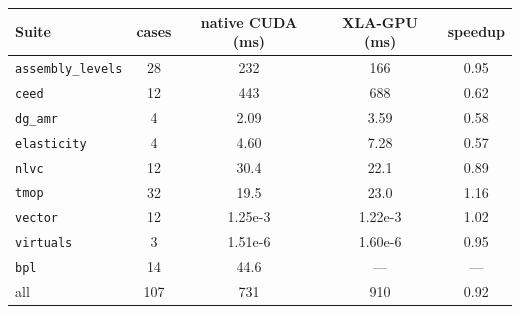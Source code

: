 \begin{tabular}{l S[table-format=3] S[table-format=4.3] S[table-format=4.3] S[table-format=1.2]}
\toprule
Suite & {cases} & {native CUDA (ms)} & {XLA-GPU (ms)} & {speedup} \\
\midrule
\texttt{assembly\_levels} & 28 & 232 & 166 & 0.95 \\
\texttt{ceed} & 12 & 443 & 688 & 0.62 \\
\texttt{dg\_amr} & 4 & 2.09 & 3.59 & 0.58 \\
\texttt{elasticity} & 4 & 4.60 & 7.28 & 0.57 \\
\texttt{nlvc} & 12 & 30.4 & 22.1 & 0.89 \\
\texttt{tmop} & 32 & 19.5 & 23.0 & 1.16 \\
\texttt{vector} & 12 & 1.25e-3 & 1.22e-3 & 1.02 \\
\texttt{virtuals} & 3 & 1.51e-6 & 1.60e-6 & 0.95 \\
\texttt{bpl} & 14 & 44.6 & {---} & {---} \\
\midrule
all & 107 & 731 & 910 & 0.92 \\
\bottomrule
\end{tabular}
